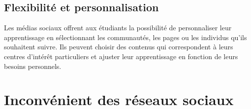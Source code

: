 \documentclass[12pt,a4paper,titlepage]{article}
\begin{document}
\subsection{Flexibilité et personnalisation }
Les médias sociaux offrent aux étudiants la possibilité de personnaliser leur apprentissage en sélectionnant les communautés, les pages ou les individus qu'ils souhaitent suivre. Ils peuvent choisir des contenus qui correspondent à leurs centres d'intérêt particuliers et ajuster leur apprentissage en fonction de leurs besoins personnels.
\section{Inconvénient des réseaux sociaux }
\end{document}

